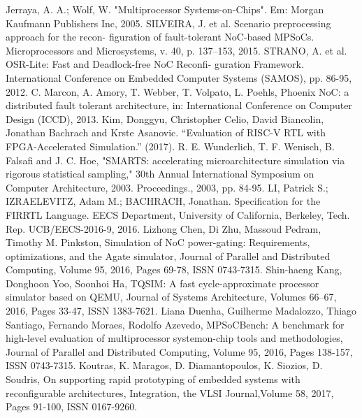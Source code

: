 \documentclass[conference]{IEEEtran}
\begin{document}
\begin{thebibliography}{00}
		 Jerraya, A. A.; Wolf, W. "Multiprocessor Systems-on-Chips". Em: Morgan
		Kaufmann Publishers Inc, 2005.
		 SILVEIRA, J. et al. Scenario preprocessing approach for the recon-
		figuration of fault-tolerant NoC-based MPSoCs. Microprocessors and
		Microsystems, v. 40, p. 137–153, 2015.
		  STRANO, A. et al. OSR-Lite: Fast and Deadlock-free NoC Reconfi-
		guration Framework. International Conference on Embedded Computer
		Systems (SAMOS), pp. 86-95, 2012.
		 C. Marcon, A. Amory, T. Webber, T. Volpato, L. Poehls, Phoenix NoC:
		a distributed fault tolerant architecture, in: International Conference on
		Computer Design (ICCD), 2013.
		 Kim, Donggyu, Christopher Celio, David Biancolin, Jonathan Bachrach and Krste Asanovic. “Evaluation of RISC-V RTL with FPGA-Accelerated Simulation.” (2017).
		 R. E. Wunderlich, T. F. Wenisch, B. Falsafi and J. C. Hoe, "SMARTS: accelerating microarchitecture simulation via rigorous statistical sampling," 30th Annual International Symposium on Computer Architecture, 2003. Proceedings., 2003, pp. 84-95.
		 LI, Patrick S.; IZRAELEVITZ, Adam M.; BACHRACH, Jonathan. Specification for the FIRRTL Language. EECS Department, University of California, Berkeley, Tech. Rep. UCB/EECS-2016-9, 2016.
		 Lizhong Chen, Di Zhu, Massoud Pedram, Timothy M. Pinkston, Simulation of NoC
		power-gating: Requirements, optimizations, and the Agate simulator, Journal of Parallel and
		Distributed Computing, Volume 95, 2016, Pages 69-78, ISSN 0743-7315.
		 Shin-haeng Kang, Donghoon Yoo, Soonhoi Ha, TQSIM: A fast cycle-approximate
		processor simulator based on QEMU, Journal of Systems Architecture, Volumes 66–67,
		2016, Pages 33-47, ISSN 1383-7621.
		 Liana Duenha, Guilherme Madalozzo, Thiago Santiago, Fernando Moraes, Rodolfo
		Azevedo, MPSoCBench: A benchmark for high-level evaluation of multiprocessor systemon-chip
		tools and methodologies, Journal of Parallel and Distributed Computing, Volume
		95, 2016, Pages 138-157, ISSN 0743-7315.
		 Koutras, K. Maragos, D. Diamantopoulos, K. Siozios, D. Soudris, On supporting rapid
		prototyping of embedded systems with reconfigurable architectures, Integration, the VLSI
		Journal,Volume 58, 2017, Pages 91-100, ISSN 0167-9260.
		
	\end{thebibliography}
	
	
\end{document}
